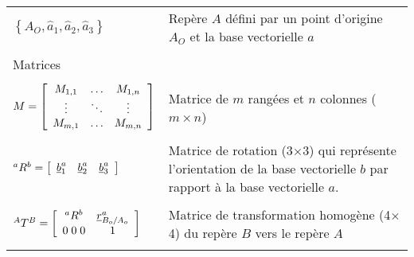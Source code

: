 \begin{center}
\begin{tabular}{p{5cm}  p{9cm}}
$\left\{ A_O , \hat{a}_1 , \hat{a}_2 , \hat{a}_3 \right\}$  & Repère $A$ défini par un point d'origine $A_O$ et la base vectorielle $a$ \\   &  \\
\multicolumn{2}{l}{Matrices} \\ \hline \\
$M=\left[ \begin{array}{c c c}
	M_{1,1} & \hdots & M_{1,n}  \\ \vdots & \ddots & \vdots \\ M_{m,1}  & \hdots & M_{m,n}
\end{array}  \right] $   
& Matrice de $m$ rangées et $n$ colonnes ($m \times n$) \\   &  \\
${}^aR^b = \left[ \begin{array}{c c c}
	\underline{b}_1^a  & \underline{b}_2^a & \underline{b}_3^a
\end{array}  \right]$            & Matrice de rotation (3$\times$3) qui représente l'orientation de la base vectorielle $b$ par rapport à la base vectorielle $a$. %
 \\   &  \\
$^{A}T^B = \left[ \begin{array}{c c}
	{}^aR^b  & \underline{r}^a_{B_o/A_o} \\ 0 \; 0 \; 0 & 1
\end{array}  \right] $           & Matrice de transformation homogène (4$\times$4) du repère $B$ vers le repère $A$\\   &  \\
\hline
\end{tabular}
\end{center}